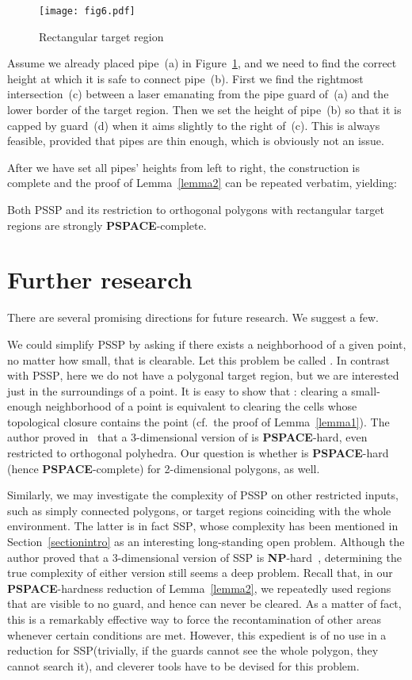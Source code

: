 \documentclass{style}
\newcommand{\complexityclass}[1]{\textbf{#1}}
\newcommand{\computproblem}[1]{\textsc{#1}}
\newcommand{\NP}{\complexityclass{NP}\xspace}
\newcommand{\PSPACE}{\complexityclass{PSPACE}\xspace}
\newcommand{\SSP}{\computproblem{SSP}\xspace}
\newcommand{\PSSP}{\computproblem{PSSP}\xspace}
\begin{document}
\begin{figure}[h]
\centering
\texttt{[image: fig6.pdf]}
\caption{Rectangular target region}
\label{fig6}
\end{figure}

Assume we already placed pipe~(a) in Figure~\ref{fig6}, and we need to find the correct height at which it is safe to connect pipe~(b). First we find the rightmost intersection~(c) between a laser emanating from the pipe guard of~(a) and the lower border of the target region. Then we set the height of pipe~(b) so that it is capped by guard~(d) when it aims slightly to the right of~(c). This is always feasible, provided that pipes are thin enough, which is obviously not an issue.

After we have set all pipes' heights from left to right, the construction is complete and the proof of Lemma~\ref{lemma2} can be repeated verbatim, yielding:

\begin{theorem}
Both \PSSP and its restriction to orthogonal polygons with rectangular target regions are strongly \PSPACE-complete. \hfill 
\end{theorem}

\section{Further research}

There are several promising directions for future research. We suggest a few.

We could simplify \PSSP by asking if there exists a neighborhood of a given point, no matter how small, that is clearable. Let this problem be called . In contrast with \PSSP, here we do not have a polygonal target region, but we are interested just in the surroundings of a point. It is easy to show that : clearing a small-enough neighborhood of a point is equivalent to clearing the cells whose topological closure contains the point (cf.~the proof of Lemma~\ref{lemma1}). The author proved in~\cite{thesis} that a 3-dimensional version of  is \PSPACE-hard, even restricted to orthogonal polyhedra. Our question is whether  is \PSPACE-hard (hence \PSPACE-complete) for 2-dimensional polygons, as well.

Similarly, we may investigate the complexity of \PSSP on other restricted inputs, such as simply connected polygons, or target regions coinciding with the whole environment. The latter is in fact \SSP, whose complexity has been mentioned in Section~\ref{sectionintro} as an interesting long-standing open problem. Although the author proved that a 3-dimensional version of \SSP is \NP-hard~\cite{viglietta2}, determining the true complexity of either version still seems a deep problem. Recall that, in our \PSPACE-hardness reduction of Lemma~\ref{lemma2}, we repeatedly used regions that are visible to no guard, and hence can never be cleared. As a matter of fact, this is a remarkably effective way to force the recontamination of other areas whenever certain conditions are met. However, this expedient is of no use in a reduction for \SSP (trivially, if the guards cannot see the whole polygon, they cannot search it), and cleverer tools have to be devised for this problem.
\end{document}
